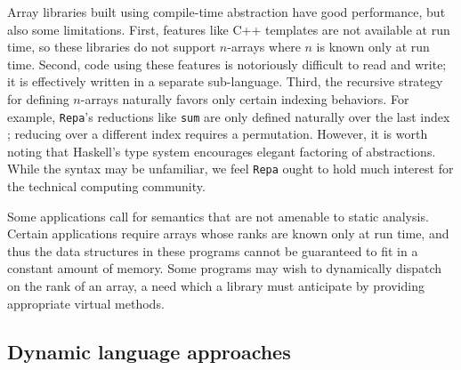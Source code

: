 \documentclass[preprint]{sigplanconf}
\newcommand{\code}[1]{\texttt{#1}}
\begin{document}
Array libraries built using compile-time abstraction have good performance,
but also some limitations.
First, features like C++ templates are not available at run time, so these
libraries do not support $n$-arrays where $n$ is known only at run time.
Second, code using these features is
notoriously difficult to read and write; it is effectively written in a
separate sub-language.
Third, the recursive strategy for defining $n$-arrays
naturally favors only certain indexing behaviors. For example,
\code{Repa}'s reductions like \code{sum} are only defined naturally over the
last index \cite{Keller:2010rs}; reducing over a different index requires
a permutation.
However, it is worth noting that Haskell's type system encourages
elegant factoring of abstractions. While the syntax may be unfamiliar,
we feel \code{Repa} ought to hold much interest for the technical computing
community.

Some applications call for semantics that are not amenable
to static analysis. Certain applications require arrays whose ranks are known
only at run time, and thus the data structures in these programs cannot be
guaranteed to fit in a constant amount of memory. Some programs may
wish to dynamically dispatch on the rank of an array, a need which a
library must anticipate by providing appropriate virtual methods.


\subsection{Dynamic language approaches}
\end{document}
